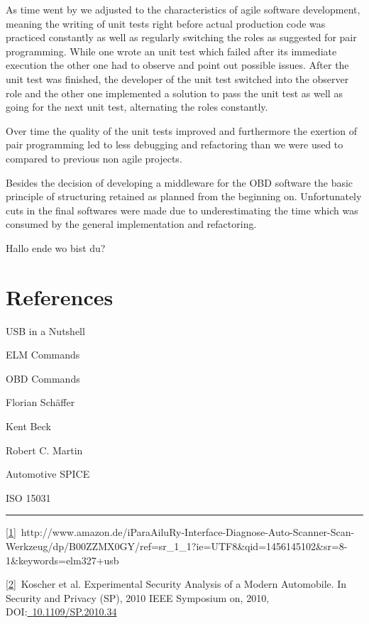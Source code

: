 {As time went by we adjusted to the characteristics of }{agile software
development, meaning the writing of unit tests right before actual
production code was practiced constantly as well as regularly switching
the roles as suggested for pair programming. While one wrote an unit
test which failed after its immediate execution the other one had to
observe and point out possible issues. After the unit test was finished,
the developer of the unit test switched into the observer role and the
other one implemented a solution to pass the unit test as well as going
for the next unit test, alternating the roles constantly.}

{Over time the quality of the unit tests improved and furthermore the
exertion of pair programming led to less debugging and refactoring than
we were used to compared to previous non agile projects.}

{Besides the decision of developing a middleware for the OBD software
the basic principle of structuring retained as planned from the
beginning on. Unfortunately cuts in the final softwares were made due to
underestimating the time which was consumed by the general
implementation and refactoring.}

{}

{Hallo ende wo bist du?}

\hypertarget{h.mzh64o82gvdq}{\section{\texorpdfstring{{References}}{References}}\label{h.mzh64o82gvdq}}

{USB in a Nutshell}

{ELM Commands}

{OBD Commands}

{Florian Schäffer }

{Kent Beck}

{Robert C. Martin}

{Automotive SPICE}

{ISO 15031}

{}

\begin{center}\rule{0.5\linewidth}{\linethickness}\end{center}

\protect\hyperlink{ftntux5fref1}{{[}1{]}}{~http://www.amazon.de/iParaAiluRy-Interface-Diagnose-Auto-Scanner-Scan-Werkzeug/dp/B00ZZMX0GY/ref=sr\_1\_1?ie=UTF8\&qid=1456145102\&sr=8-1\&keywords=elm327+usb}

\protect\hyperlink{ftntux5fref2}{{[}2{]}}{~}{Koscher et al. Experimental
Security Analysis of a Modern Automobile. }{In Security and Privacy
(SP), 2010 IEEE Symposium on}{, 2010,
DOI:}{\href{https://www.google.com/url?q=http://dx.doi.org/10.1109/SP.2010.34\&sa=D\&ust=1460827923758000\&usg=AFQjCNGcRSFStl3xg5e6ejJJzzZ7UxIUnw}{~}}{\href{https://www.google.com/url?q=http://dx.doi.org/10.1109/SP.2010.34\&sa=D\&ust=1460827923759000\&usg=AFQjCNE4oc1RPHni0YpsJqyZNhOBWoP62A}{10.1109/SP.2010.34}}

